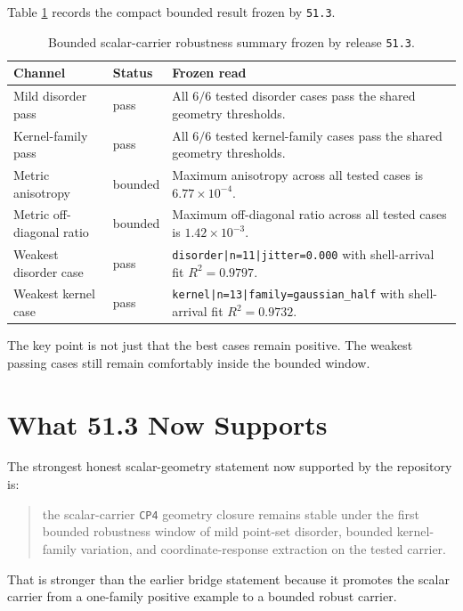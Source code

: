\documentclass[11pt]{article}
\begin{document}
Table \ref{tab:robustness_summary} records the compact bounded result frozen by \texttt{51.3}.

\begin{table}[h!]
\centering
\begin{tabular}{@{}p{3.7cm}p{2.2cm}p{8.0cm}@{}}
\toprule
Channel & Status & Frozen read \\
\midrule
Mild disorder pass & pass & All \(6/6\) tested disorder cases pass the shared geometry thresholds. \\
Kernel-family pass & pass & All \(6/6\) tested kernel-family cases pass the shared geometry thresholds. \\
Metric anisotropy & bounded & Maximum anisotropy across all tested cases is \(6.77 \times 10^{-4}\). \\
Metric off-diagonal ratio & bounded & Maximum off-diagonal ratio across all tested cases is \(1.42 \times 10^{-3}\). \\
Weakest disorder case & pass & \texttt{disorder|n=11|jitter=0.000} with shell-arrival fit \(R^2 = 0.9797\). \\
Weakest kernel case & pass & \texttt{kernel|n=13|family=gaussian\_half} with shell-arrival fit \(R^2 = 0.9732\). \\
\bottomrule
\end{tabular}
\caption{Bounded scalar-carrier robustness summary frozen by release \texttt{51.3}.}
\label{tab:robustness_summary}
\end{table}

The key point is not just that the best cases remain positive. The weakest passing cases still remain comfortably inside the bounded window.

\section{What 51.3 Now Supports}

The strongest honest scalar-geometry statement now supported by the repository is:

\begin{quote}
the scalar-carrier \texttt{CP4} geometry closure remains stable under the first bounded robustness window of mild point-set disorder, bounded kernel-family variation, and coordinate-response extraction on the tested carrier.
\end{quote}

That is stronger than the earlier bridge statement because it promotes the scalar carrier from a one-family positive example to a bounded robust carrier.
\end{document}
